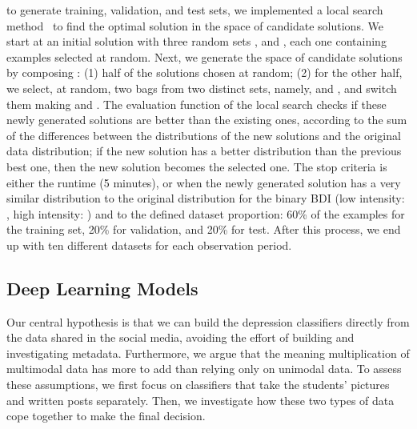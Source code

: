 \documentclass[letterpaper]{article} \usepackage{aaai20}  \usepackage{times}  \usepackage{helvet} \usepackage{courier}  \usepackage[hyphens]{url}  \usepackage{graphicx} \urlstyle{rm} \def\UrlFont{\rm}  \usepackage{graphicx}  \frenchspacing  \setlength{\pdfpagewidth}{8.5in}  \setlength{\pdfpageheight}{11in}  \usepackage[final]{changes}
\begin{document}
 to generate training, validation, and test sets, we implemented a local search method~\cite{gendreau2010handbook} to find the optimal solution in the space of candidate solutions. We start at an initial solution with three random sets ,  and , each one containing examples  selected at random. Next, we generate the space of candidate solutions by composing : (1) half of the solutions chosen at random; (2) for the other half, we select, at random, two bags from two distinct sets, namely,  and , and switch them making  and . The evaluation function of the local search checks if these newly generated solutions are better than the existing ones, according to the sum of the differences between the distributions of the new solutions and the original data distribution; if the new solution has a better distribution than the previous best one, then the new solution becomes the selected one. The stop criteria is either the runtime (5 minutes), or when the  newly generated solution has a very similar distribution to the original distribution for the binary BDI (low intensity: , high intensity: ) and to the defined dataset proportion: 60\% of the examples for the training set, 20\% for validation, and 20\% for test. After this process, we end up with ten different datasets for each observation period.


\subsection{Deep Learning Models}\label{sec:dl-models}

Our central hypothesis is that we can build the depression classifiers directly from the data shared in the social media, avoiding the effort of building and investigating metadata. Furthermore, we argue that the meaning multiplication of multimodal data has more to add than relying only on unimodal data. To assess these assumptions, we first focus on classifiers that take the students' pictures and written posts separately. Then, we investigate how these two types of data cope together to make the final decision. 
\end{document}

